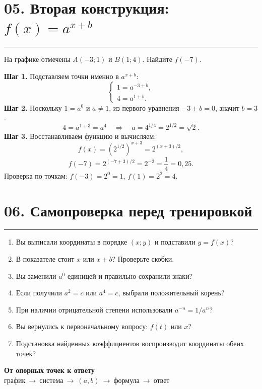 \documentclass[a4paper,12pt]{article}
\newcommand{\sectionline}{\par\vspace{-3pt}\noindent\textcolor{accent}{\rule{\linewidth}{0.5pt}}\par\vspace{2pt}}
\begin{document}
\section*{05. Вторая конструкция: \(f(x)=a^{x+b}\)}
\sectionline
На графике отмечены $A(-3;1)$ и $B(1;4)$. Найдите $f(-7)$.
\begin{center}
\end{center}
\textbf{Шаг 1.} Подставляем точки именно в $a^{x+b}$:
\[
\begin{cases}
1=a^{-3+b},\\
4=a^{1+b}.
\end{cases}
\]
\textbf{Шаг 2.} Поскольку $1=a^0$ и $a\ne1$, из первого уравнения $-3+b=0$, значит $b=3$.
\[
4=a^{1+3}=a^4\quad\Longrightarrow\quad a=4^{1/4}=2^{1/2}=\sqrt2.
\]
\textbf{Шаг 3.} Восстанавливаем функцию и вычисляем:
\[
 f(x)=(2^{1/2})^{x+3}=2^{(x+3)/2},
\]
\[
 f(-7)=2^{(-7+3)/2}=2^{-2}=\frac14=\boxed{0{,}25}.
\]
\textcolor{muted}{Проверка по точкам: $f(-3)=2^0=1$, $f(1)=2^2=4$.}

\clearpage
\section*{06. Самопроверка перед тренировкой}
\sectionline
\begin{enumerate}[label=\arabic*.]
\item Вы выписали координаты в порядке $(x;y)$ и подставили $y=f(x)$?
\item В показателе стоит $x$ или $x+b$? Проверьте скобки.
\item Вы заменили $a^0$ единицей и правильно сохранили знаки?
\item Если получили $a^2=c$ или $a^4=c$, выбрали положительный корень?
\item При наличии отрицательной степени использовали $a^{-n}=1/a^n$?
\item Вы вернулись к первоначальному вопросу: $f(t)$ или $x$?
\item Подстановка найденных коэффициентов воспроизводит координаты обеих точек?
\end{enumerate}
\vspace{8mm}
\begin{center}
{\Large\bfseries\textcolor{darkaccent}{От опорных точек к ответу}}\\[3mm]
$\text{график}\ \longrightarrow\ \text{система}\ \longrightarrow\ (a,b)
\ \longrightarrow\ \text{формула}\ \longrightarrow\ \text{ответ}$
\end{center}
\clearpage
\end{document}
